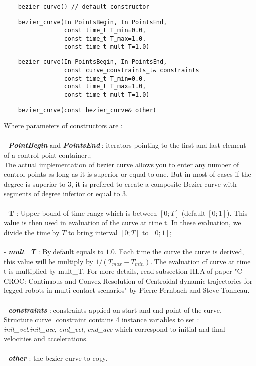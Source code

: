 \documentclass{article}
\begin{document}
    \begin{lstlisting}
    bezier_curve() // default constructor
    \end{lstlisting}

    \begin{lstlisting}
    bezier_curve(In PointsBegin, In PointsEnd,
                 const time_t T_min=0.0,
                 const time_t T_max=1.0,
                 const time_t mult_T=1.0)
    \end{lstlisting}

    \begin{lstlisting}
    bezier_curve(In PointsBegin, In PointsEnd,
                 const curve_constraints_t& constraints
                 const time_t T_min=0.0,
                 const time_t T_max=1.0,
                 const time_t mult_T=1.0)
    \end{lstlisting}

    \begin{lstlisting}
    bezier_curve(const bezier_curve& other)
    \end{lstlisting}

    \noindent
    Where parameters of constructors are : \\\\
    - \textbf{\textit{PointBegin}} and \textbf{\textit{PointsEnd}} : iterators pointing to the first and last element of a control point container.;\\ The actual implementation of bezier curve allows you to enter any number of control points as long as it is superior or equal to one. But in most of cases if the degree is superior to 3, it is prefered to create a composite Bezier curve with segments of degree inferior or equal to 3.\\\\
    - \textbf{T} : Upper bound of time range which is between $[0;T]$ (default $[0;1]$). This value is then used in evaluation of the curve at time t. In these evaluation, we divide the time by $T$ to bring interval $[0;T]$ to $[0;1]$;\\\\
    - \textbf{\textit{mult\_T}} : By default equals to $1.0$. Each time the curve the curve is derived, this value will be multiply by $1/(T_{max}-T_{min})$. The evaluation of curve at time t is multiplied by mult\_T. For more details, read subsection III.A of paper "C-CROC: Continuous and Convex Resolution of Centroidal dynamic trajectories for legged robots in multi-contact scenarios" by Pierre Fernbach and Steve Tonneau.\\\\
    - \textbf{\textit{constraints}} : constraints applied on start and end point of the curve.\\
    Structure curve\_constraint contains 4 instance variables to set : \textit{init\_vel},\textit{init\_acc}, \textit{end\_vel}, \textit{end\_acc} which correspond to initial and final velocities and accelerations.\\\\
    - \textbf{\textit{other}} : the bezier curve to copy.
\end{document}
